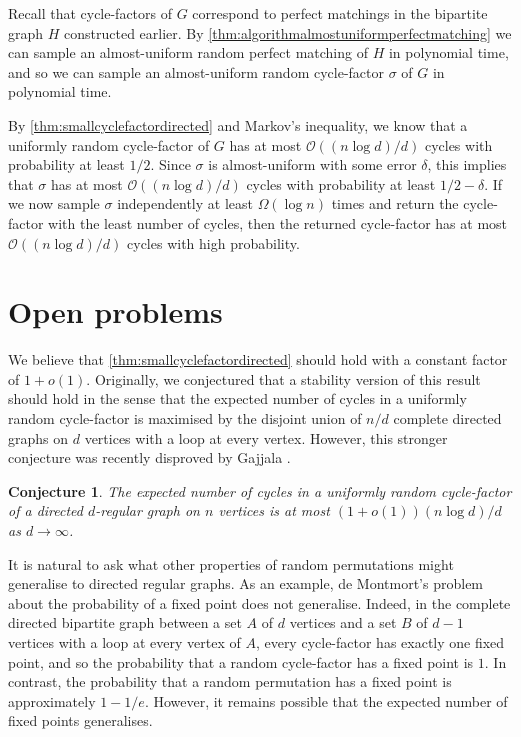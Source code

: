 \documentclass[11pt]{article}
\makeatletter
\theoremstyle{plain}
\newtheorem{conjecture}[theorem]{Conjecture}
\theoremstyle{definition}
\renewenvironment{proof}[1][\proofname]
{\par\pushQED{\qed}
	\normalfont\topsep6\p@\@plus6\p@\relax\trivlist
	\item[\hskip\labelsep\bfseries#1\@addpunct{.}]
	\ignorespaces}
{\popQED\endtrivlist\@endpefalse}
\newcommand{\cO}{\mathcal O}
\makeatother
\begin{document}
\begin{proof}[Proof of \cref{cor:algorithmsmallcyclefactordirected}]
    Recall that cycle-factors of $G$ correspond to perfect matchings in the bipartite graph $H$ constructed earlier. By \cref{thm:algorithmalmostuniformperfectmatching} we can sample an almost-uniform random perfect matching of $H$ in polynomial time, and so we can sample an almost-uniform random cycle-factor $\sigma$ of $G$ in polynomial time.

    By \cref{thm:smallcyclefactordirected} and Markov's inequality, we know that a uniformly random cycle-factor of $G$ has at most $\cO((n\log d)/d)$ cycles with probability at least $1/2$. Since $\sigma$ is almost-uniform with some error $\delta$, this implies that $\sigma$ has at most $\cO((n\log d)/d)$ cycles with probability at least $1/2 - \delta$. If we now sample $\sigma$ independently at least $\Omega(\log n)$ times and return the cycle-factor with the least number of cycles, then the returned cycle-factor has at most $\cO((n\log d)/d)$ cycles with high probability.
\end{proof}

\section{Open problems}\label{sec:openproblems}

We believe that \cref{thm:smallcyclefactordirected} should hold with a constant factor of $1 + o(1)$. Originally, we conjectured that a stability version of this result should hold in the sense that the expected number of cycles in a uniformly random cycle-factor is maximised by the disjoint union of $n/d$ complete directed graphs on $d$ vertices with a loop at every vertex. However, this stronger conjecture was recently disproved by Gajjala \cite{gajjala2026counterexamples}.

\begin{conjecture}
    The expected number of cycles in a uniformly random cycle-factor of a directed $d$-regular graph on $n$ vertices is at most $(1 + o(1)) (n \log d) / d$ as $d \to \infty$.
\end{conjecture}

It is natural to ask what other properties of random permutations might generalise to directed regular graphs. As an example, de Montmort's problem about the probability of a fixed point does not generalise. Indeed, in the complete directed bipartite graph between a set $A$ of $d$ vertices and a set $B$ of $d-1$ vertices with a loop at every vertex of $A$, every cycle-factor has exactly one fixed point, and so the probability that a random cycle-factor has a fixed point is $1$. In contrast, the probability that a random permutation has a fixed point is approximately $1-1/e$. However, it remains possible that the expected number of fixed points generalises.
\end{document}

